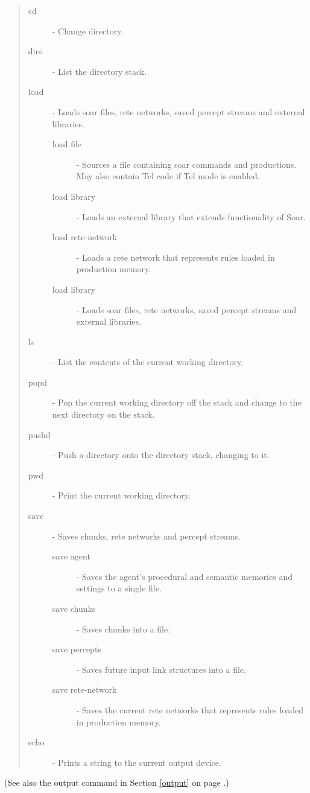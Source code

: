 \begin{quote}
	\begin{description}
		\item[cd] - Change directory.
		\item[dirs] - List the directory stack.
		\item[load] - Loads soar files, rete networks, saved percept streams and external libraries.
		\begin{description}
			\item[load file] - Sources a file containing soar commands and productions.  May also contain Tcl code if Tcl mode is enabled.
			\item[load library] - Loads an external library that extends functionality of Soar.
			\item[load rete-network] - Loads a rete network that represents rules loaded in production memory.
			\item[load library] - Loads soar files, rete networks, saved percept streams and external libraries.
		\end{description}
		\item[ls] - List the contents of the current working directory.
		\item[popd] - Pop the current working directory off the stack and change to the next directory on the stack.
		\item[pushd] - Push a directory onto the directory stack, changing to it.
		\item[pwd] - Print the current working directory.
		\item[save] - Saves chunks, rete networks and percept streams.
		\begin{description}
			\item[save agent] - Saves the agent's procedural and semantic memories and settings to a single file.
			\item[save chunks] - Saves chunks into a file.
			\item[save percepts] - Saves future input link structures into a file.
			\item[save rete-network] - Saves the current rete networks that represents rules loaded in production memory.
		\end{description}
		\item[echo] - Prints a string to the current output device.
	\end{description}
\end{quote}

(See also the output command in Section \ref{output} on page \pageref{output}.)

